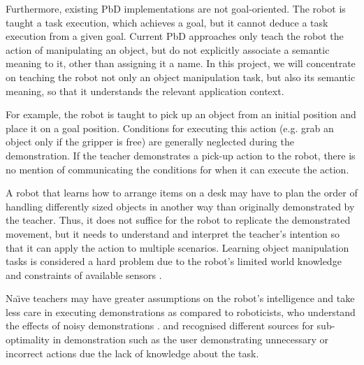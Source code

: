 Furthermore, existing PbD implementations are not goal-oriented.
The robot is taught a task execution, which achieves a goal, but it cannot deduce a task execution from a given goal.
Current PbD approaches only teach the robot the action of manipulating an object, but do not explicitly associate a semantic meaning to it, other than assigning it a  name.
In this project, we will concentrate on teaching the robot not only an object manipulation task, but also its semantic meaning, so that it understands the relevant application context.

For example, the robot is taught to pick up an object from an initial position and place it on a goal position.
Conditions for executing this action (e.g.
grab an object only if the gripper is free) are generally neglected during the demonstration.
If the teacher demonstrates a pick-up action to the robot, there is no mention of communicating the conditions for when it can execute the action.


A robot that learns how to arrange items on a desk may have to plan the order of handling differently sized objects in another way than originally demonstrated by the teacher.
Thus, it does not suffice for the robot to replicate the demonstrated movement, but it needs to understand and interpret the teacher's intention so that it can apply the action to multiple scenarios.
Learning object manipulation tasks is considered a hard problem due to the robot's limited world knowledge and constraints of available sensors \cite{ekvall2008robot}.

Na\"{\i}ve teachers may have greater assumptions on the robot's intelligence and take less care in executing demonstrations as compared to roboticists, who understand the effects of noisy demonstrations \cite{suay2012practical}.
\cite{chen2003programing} and \cite{kaiser1995obtaining} recognised different sources for sub-optimality in demonstration such as the user demonstrating unnecessary or incorrect actions due the lack of knowledge about the task.

